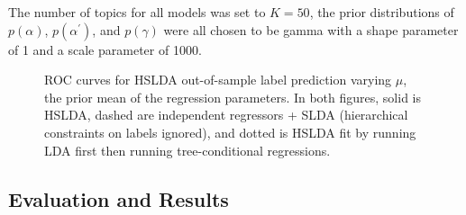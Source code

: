 The number of topics for all models was set to $K=50$, the prior distributions of
$p\left(\alpha\right)$, $p\left(\alpha^{\prime}\right)$, and
$p\left(\gamma\right)$ were all chosen to be gamma with a shape parameter of 1 and a
scale parameter of 1000. 

\begin{figure}[h]
\begin{center}
\caption{ROC curves for HSLDA out-of-sample label prediction varying $\mu$, the prior mean of the regression parameters. 
In both figures, solid is HSLDA, dashed are independent regressors + SLDA (hierarchical 
constraints on labels ignored), and dotted is HSLDA fit by running LDA first then running 
tree-conditional regressions.}
\end{center}
\end{figure}


\subsection{Evaluation and Results}

